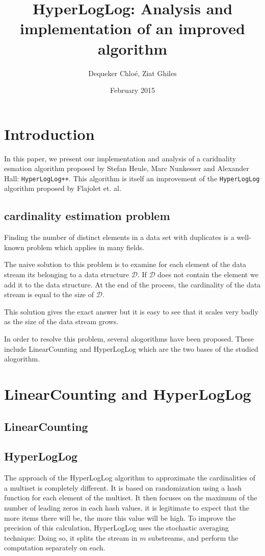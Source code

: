 \documentclass{article}
\title{HyperLogLog: Analysis and implementation of an improved algorithm}
\author{Dequeker Chloé, Ziat Ghiles}
\date{February 2015}
\begin{document}
\maketitle
\clearpage

\tableofcontents
\clearpage

\section{Introduction}
In this paper, we present our implementation and analysis of a
caridnality esmation algorithm proposed by Stefan Heule, Marc
Nunkesser and Alexander Hall: \texttt{HyperLogLog++}. This algorithm
is itself an improvement of the \texttt{HyperLogLog} algorithm
proposed by Flajolet et. al.

\subsection{cardinality estimation problem}
Finding the number of distinct elements in a data set with duplicates
is a well-known problem which applies in many fields.

The naive solution to this problem is to examine for each element of
the data stream its belonging to a data structure $\mathcal{D}$. If
$\mathcal{D}$ does not contain the element we add it to the data
structure. At the end of the process, the cardinality of the data
stream is equal to the size of $\mathcal{D}$.

This solution gives the exact answer but it is easy to see that it
scales very badly as the size of the data stream grows.

In order to resolve this problem, several alogorithms have been
proposed. These include LinearCounting and HyperLogLog which are the two
bases of the studied alogorithm.
\section{LinearCounting and HyperLogLog}
\subsection{LinearCounting}
\subsection{HyperLogLog}
The approach of the HyperLogLog algorithm to approximate the
cardinalities of a multiset is completely different. It is based on
randomization using a hash function for each element of the
multiset. It then focuses on the maximum of the number of leading
zeros in each hash values. it is legitimate to expect that the more
items there will be, the more this value will be high.  To improve the
precision of this calculation, HyperLogLog uses the stochastic
averaging technique: Doing so, it splits the stream in $m$ substreams,
and perform the computation separately on each.
\end{document}
